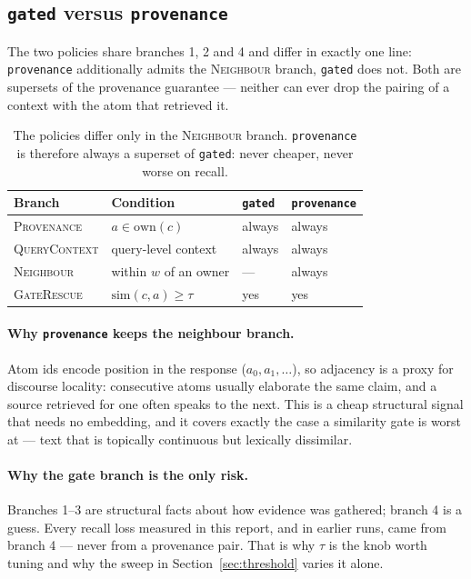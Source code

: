 \documentclass[11pt]{article}
\begin{document}
\subsection{\texttt{gated} versus \texttt{provenance}}
The two policies share branches 1, 2 and 4 and differ in exactly one line: \texttt{provenance} additionally admits the \textsc{Neighbour} branch, \texttt{gated} does not. Both are supersets of the provenance guarantee --- neither can ever drop the pairing of a context with the atom that retrieved it.

\begin{table}[htbp]
\centering
\begin{tabular}{llll}
\toprule
Branch & Condition & \texttt{gated} & \texttt{provenance} \\
\midrule
\textsc{Provenance} & $a \in \mathrm{own}(c)$ & always & always \\
\textsc{QueryContext} & query-level context & always & always \\
\textsc{Neighbour} & within $w$ of an owner & --- & always \\
\textsc{GateRescue} & $\mathrm{sim}(c,a) \ge \tau$ & yes & yes \\
\bottomrule
\end{tabular}
\caption{The policies differ only in the \textsc{Neighbour} branch. \texttt{provenance} is therefore always a superset of \texttt{gated}: never cheaper, never worse on recall.}
\label{tab:policies}
\end{table}

\paragraph{Why \texttt{provenance} keeps the neighbour branch.} Atom ids encode position in the response ($a_0, a_1, \dots$), so adjacency is a proxy for discourse locality: consecutive atoms usually elaborate the same claim, and a source retrieved for one often speaks to the next. This is a cheap structural signal that needs no embedding, and it covers exactly the case a similarity gate is worst at --- text that is topically continuous but lexically dissimilar.

\paragraph{Why the gate branch is the only risk.} Branches 1--3 are structural facts about how evidence was gathered; branch 4 is a guess. Every recall loss measured in this report, and in earlier runs, came from branch 4 --- never from a provenance pair. That is why $\tau$ is the knob worth tuning and why the sweep in Section~\ref{sec:threshold} varies it alone.
\end{document}
